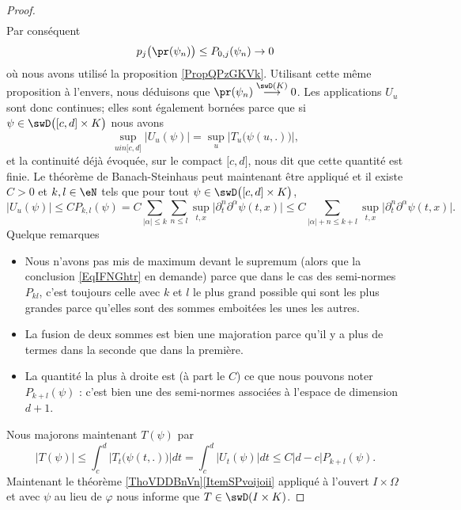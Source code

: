 \begin{proof}
\begin{subequations}
\begin{align}
        \end{align}
    \end{subequations}
    Par conséquent
    \begin{equation}
        p_j\big( \pr(\psi_n) \big)\leq P_{0,j}(\psi_n)\to 0
    \end{equation}
    où nous avons utilisé la proposition \ref{PropQPzGKVk}. Utilisant cette même proposition à l'envers, nous déduisons que \( \pr(\psi_n)\stackrel{\swD(K)}{\longrightarrow}0\). Les applications \( U_u\) sont donc continues; elles sont également bornées parce que si \( \psi\in\swD\big( \mathopen[ c , d \mathclose]\times K \big) \) nous avons
    \begin{equation}
        \sup_{u in\mathopen[ c , d \mathclose]}\big| U_u(\psi) \big|=\sup_u \big| T_u\big( \psi(u,.) \big) \big|,    
    \end{equation}
    et la continuité déjà évoquée, sur le compact \( \mathopen[ c , d \mathclose]\), nous dit que cette quantité est finie. Le théorème de Banach-Steinhaus peut maintenant être appliqué et il existe \( C>0\) et \( k,l\in \eN\) tels que pour tout \( \psi\in\swD\big( \mathopen[ c , d \mathclose]\times K \big)\),
    \begin{equation}
        \big| U_u(\psi) \big|\leq C P_{k,l}(\psi)=C\sum_{| \alpha |\leq k}\sum_{n\leq l}\sup_{t,x}\big| \partial_t^n\partial^{\alpha}\psi(t,x) \big|\leq C\sum_{| \alpha |+n\leq k+l}\sup_{t,x}\big| \partial_t^n\partial^{\alpha}\psi(t,x) \big|.
    \end{equation}
    Quelque remarques
    \begin{itemize}
        \item Nous n'avons pas mis de maximum devant le supremum (alors que la conclusion \eqref{EqIFNGhtr} en demande) parce que dans le cas des semi-normes \( P_{kl}\), c'est toujours celle avec \( k\) et \( l\) le plus grand possible qui sont les plus grandes parce qu'elles sont des sommes emboitées les unes les autres.
        \item La fusion de deux sommes est bien une majoration parce qu'il y a plus de termes dans la seconde que dans la première.
        \item La quantité la plus à droite est (à part le \( C\)) ce que nous pouvons noter \( P_{k+l}(\psi)\) : c'est bien une des semi-normes associées à l'espace de dimension \( d+1\).
    \end{itemize}
    Nous majorons maintenant \( T(\psi)\) par
    \begin{equation}
            \big| T(\psi) \big|\leq \int_c^d\big| T_t\big( \psi(t,.) \big) \big|dt
            =\int_c^d\big|   U_t(\psi) \big|dt
            \leq C| d-c |P_{k+l}(\psi).
    \end{equation}
    Maintenant le théorème \ref{ThoVDDBnVn}\ref{ItemSPvoijoii} appliqué à l'ouvert \( I\times \Omega\) et avec \( \psi\) au lieu de \( \varphi\) nous informe que \( T\in\swD(I\times K)\). 
\end{proof}

